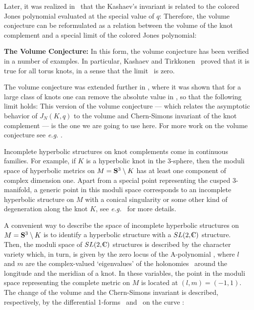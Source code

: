 Later, it was realized in \MM\ that the Kashaev's invariant
is related to the colored Jones polynomial
evaluated at the special value of $q$:
%
\eqn{}
%
Therefore, the volume conjecture can be reformulated as
a relation between the volume of the knot complement and
a special limit of the colored Jones polynomial:

{\bf The Volume Conjecture:}
%
\eqn{}
%
In this form, the volume conjecture has been verified in a number
of examples. In particular, Kashaev and Tirkkonen \KT\ proved
that it is true for all torus knots, in a sense that
the limit \volumeconj\ is zero.

The volume conjecture was extended further in \MMOTY,
where it was shown that for a large class of knots
one can remove the absolute value in \volumeconj,
so that the following limit holds:
%
\eqn{}
%
This version of the volume conjecture ---
which relates the asymptotic behavior of $J_N (K,q)$ to
the volume and Chern-Simons invariant of the knot complement
--- is the one we are going to use here.
For more work on the volume conjecture see {\it e.g.}
.



Incomplete hyperbolic structures on
knot complements come in continuous families.
For example, if $K$ is a hyperbolic knot in the 3-sphere,
then the moduli space of hyperbolic metrics on $M = \S^3 \setminus K$
has at least one component of complex dimension one.
Apart from a special point representing the cusped 3-manifold,
a generic point in this moduli space corresponds to
an incomplete hyperbolic structure on $M$ with
a conical singularity or some other kind of degeneration
along the knot $K$, see {\it e.g.} \Hodgson\ for more details.

A convenient way to describe the space of incomplete hyperbolic
structures on $M = \S^3 \setminus K$ is to identify
a hyperbolic structure with a $SL(2,\IC)$ structure.
Then, the moduli space of $SL(2,\IC)$ structures is described
by the character variety which, in turn, is given by
the zero locus of the A-polynomial \CCGLS,
%
\eqn{}
%
where $l$ and $m$ are the complex-valued `eigenvalues' of
the holonomies \lmholonomies\
around the longitude and the meridian of a knot.
In these variables, the point in the moduli space representing
the complete metric on $M$ is located at $(l,m)=(-1,1)$.
The change of the volume and the Chern-Simons invariant is described,
respectively, by the differential 1-forms \volfla\ and \csfla\
on the curve \azerolocus:
%
\eqn\csvoldiff{\eqalign{
& d ~\Vol (M)
= 2 \Big( - \log |l| d (\arg m) + \log |m| d (\arg l) \Big) \cr
& d ~CS(M)
= - {1 \over \pi^2} \Big( \log |m| d \log |l| + (\arg l) d (\arg m) \Big)
}}
%

